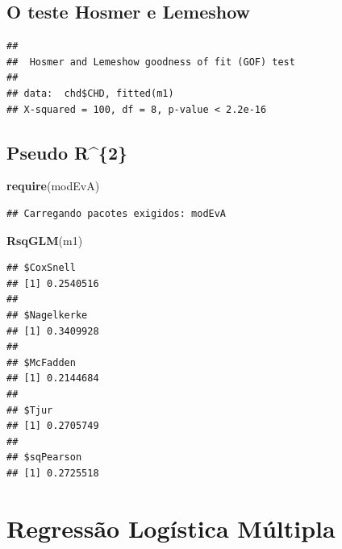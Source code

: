 \documentclass[12pt,brazil,]{book}
\newenvironment{Shaded}{\begin{snugshade}}{\end{snugshade}}
\newcommand{\DataTypeTok}[1]{\textcolor[rgb]{0.13,0.29,0.53}{#1}}
\newcommand{\DecValTok}[1]{\textcolor[rgb]{0.00,0.00,0.81}{#1}}
\newcommand{\KeywordTok}[1]{\textcolor[rgb]{0.13,0.29,0.53}{\textbf{#1}}}
\newcommand{\NormalTok}[1]{#1}
\newcommand{\OperatorTok}[1]{\textcolor[rgb]{0.81,0.36,0.00}{\textbf{#1}}}
\begin{document}
\hypertarget{o-teste-hosmer-e-lemeshow}{%
\subsection{O teste Hosmer e Lemeshow}\label{o-teste-hosmer-e-lemeshow}}

\begin{Shaded}
\end{Shaded}

\begin{verbatim}
## 
##  Hosmer and Lemeshow goodness of fit (GOF) test
## 
## data:  chd$CHD, fitted(m1)
## X-squared = 100, df = 8, p-value < 2.2e-16
\end{verbatim}

\hypertarget{pseudo-r2}{%
\subsection{Pseudo R\^{}\{2\}}\label{pseudo-r2}}

\begin{Shaded}
\begin{Highlighting}[]
\KeywordTok{require}\NormalTok{(modEvA)}
\end{Highlighting}
\end{Shaded}

\begin{verbatim}
## Carregando pacotes exigidos: modEvA
\end{verbatim}

\begin{Shaded}
\begin{Highlighting}[]
\KeywordTok{RsqGLM}\NormalTok{(m1)}
\end{Highlighting}
\end{Shaded}

\begin{verbatim}
## $CoxSnell
## [1] 0.2540516
## 
## $Nagelkerke
## [1] 0.3409928
## 
## $McFadden
## [1] 0.2144684
## 
## $Tjur
## [1] 0.2705749
## 
## $sqPearson
## [1] 0.2725518
\end{verbatim}

\hypertarget{regressao-logistica-multipla}{%
\section{Regressão Logística
Múltipla}\label{regressao-logistica-multipla}}
\end{document}
